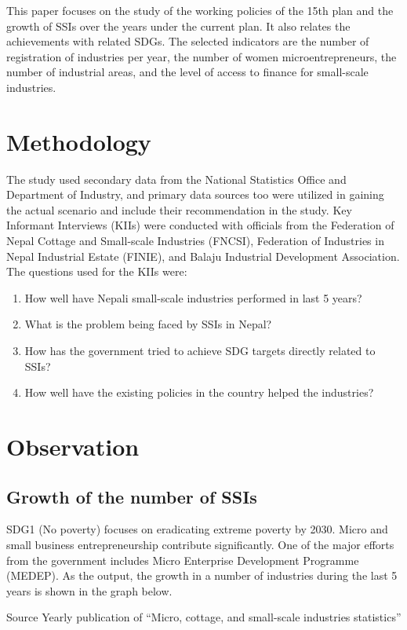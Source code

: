 \documentclass[a4paper]{article}
\begin{document}
This paper focuses on the study of the working policies of the 15th plan and the growth of SSIs over the years under the current plan. It also relates the achievements with related SDGs. The selected indicators are the number of registration of industries per year, the number of women microentrepreneurs, the number of industrial areas, and the level of access to finance for small-scale industries. 

\section{Methodology}
The study used secondary data from the National Statistics Office and Department of Industry, and primary data sources too were utilized in gaining the actual scenario and include their recommendation in the study. Key Informant Interviews (KIIs) were conducted with officials from the Federation of Nepal Cottage and Small-scale Industries (FNCSI), Federation of Industries in Nepal Industrial Estate (FINIE), and Balaju Industrial Development Association. The questions used for the KIIs were:
\begin{enumerate}
\setlength{\labelwidth}{3em}
\setlength{\itemsep}{0pt}
  \item How well have Nepali small-scale industries performed in last 5 years?
  \item What is the problem being faced by SSIs in Nepal?
  \item How has the government tried to achieve SDG targets directly related to SSIs?
  \item How well have the existing policies in the country helped the industries?
\end{enumerate}


\section{Observation}
\subsection{Growth of the number of SSIs}
SDG1 (No poverty) focuses on eradicating extreme poverty by 2030. Micro and small business entrepreneurship contribute significantly. One of the major efforts from the government includes Micro Enterprise Development Programme (MEDEP). As the output, the growth in a number of industries during the last 5 years is shown in the graph below.

Source Yearly publication of “Micro, cottage, and small-scale industries statistics”
\end{document}
